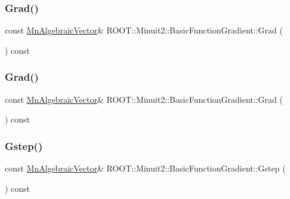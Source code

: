 \subsubsection{\texorpdfstring{Grad()}{Grad()}\hspace{0.1cm}{\footnotesize\ttfamily [2/3]}}
{\footnotesize\ttfamily const \mbox{\hyperlink{namespaceROOT_1_1Minuit2_a62ed97730a1ca8d3fbaec64a19aa11c9}{Mn\+Algebraic\+Vector}}\& R\+O\+O\+T\+::\+Minuit2\+::\+Basic\+Function\+Gradient\+::\+Grad (\begin{DoxyParamCaption}{ }\end{DoxyParamCaption}) const\hspace{0.3cm}{\ttfamily [inline]}}

\mbox{\label{classROOT_1_1Minuit2_1_1BasicFunctionGradient_a724c9b5e8c9cf8646eb362017158f52d}} 
\subsubsection{\texorpdfstring{Grad()}{Grad()}\hspace{0.1cm}{\footnotesize\ttfamily [3/3]}}
{\footnotesize\ttfamily const \mbox{\hyperlink{namespaceROOT_1_1Minuit2_a62ed97730a1ca8d3fbaec64a19aa11c9}{Mn\+Algebraic\+Vector}}\& R\+O\+O\+T\+::\+Minuit2\+::\+Basic\+Function\+Gradient\+::\+Grad (\begin{DoxyParamCaption}{ }\end{DoxyParamCaption}) const\hspace{0.3cm}{\ttfamily [inline]}}

\mbox{\label{classROOT_1_1Minuit2_1_1BasicFunctionGradient_a32966146618c6e1435f76dd851e7c014}} 
\subsubsection{\texorpdfstring{Gstep()}{Gstep()}\hspace{0.1cm}{\footnotesize\ttfamily [1/3]}}
{\footnotesize\ttfamily const \mbox{\hyperlink{namespaceROOT_1_1Minuit2_a62ed97730a1ca8d3fbaec64a19aa11c9}{Mn\+Algebraic\+Vector}}\& R\+O\+O\+T\+::\+Minuit2\+::\+Basic\+Function\+Gradient\+::\+Gstep (\begin{DoxyParamCaption}{ }\end{DoxyParamCaption}) const\hspace{0.3cm}{\ttfamily [inline]}}

